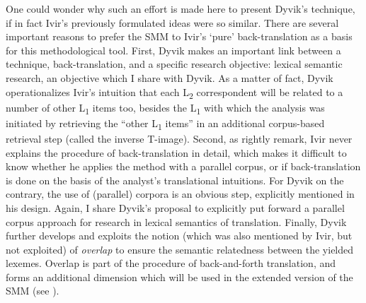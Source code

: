 One could wonder why such an effort is made here to present Dyvik’s technique, if in fact Ivir’s previously formulated ideas were so similar. There are several important reasons to prefer the SMM to Ivir’s ‘pure’ back-translation as a basis for this methodological tool. First, Dyvik makes an important link between a technique, back-translation, and a specific research objective: lexical semantic research, an objective which I share with Dyvik. As a matter of fact, Dyvik operationalizes Ivir’s intuition that each L\textsubscript{2} correspondent will be related to a number of other L\textsubscript{1} items too, besides the L\textsubscript{1} with which the analysis was initiated \citep[478]{dirven_functionalism_1987} by retrieving the “other L\textsubscript{1} items” in an additional corpus-based retrieval step (called the inverse T-image). Second, as \citet[25]{ebeling_patterns_2013} rightly remark, Ivir never explains the procedure of back-translation in detail, which makes it difficult to know whether he applies the method with a parallel corpus, or if back-translation is done on the basis of the analyst’s translational intuitions. For Dyvik on the contrary, the use of (parallel) corpora is an obvious step, explicitly mentioned in his design. Again, I share Dyvik’s proposal to explicitly put forward a parallel corpus approach for research in lexical semantics of translation. Finally, Dyvik further develops and exploits the notion (which was also mentioned by Ivir, but not exploited) of \textit{overlap} to ensure the semantic relatedness between the yielded lexemes. Overlap is part of the procedure of back-and-forth translation, and forms an additional dimension which will be used in the extended version of the SMM (see ).

